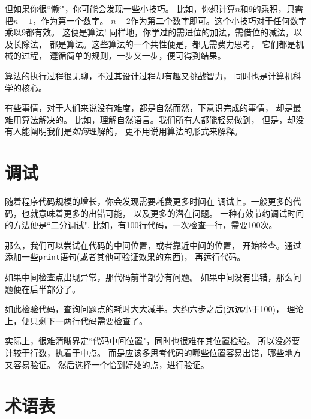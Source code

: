 \documentclass[10pt]{book}
\begin{document}
但如果你很``懒`"，你可能会发现一些小技巧。
比如，你想计算$n$和9的乘积，只需把$n-1$，作为第一个数字。
$n-2$作为第二个数字即可。这个小技巧对于任何数字乘以9都有效。
这便是算法!
同样地，你学过的需进位的加法，需借位的减法，以及长除法，
都是算法。这些算法的一个共性便是，都无需费力思考，
它们都是机械的过程，
遵循简单的规则，一步又一步，便可得到结果。

算法的执行过程很无聊，不过其设计过程却有趣又挑战智力，
同时也是计算机科学的核心。

有些事情，对于人们来说没有难度，都是自然而然，下意识完成的事情，
却是最难用算法解决的。
比如，理解自然语言。我们所有人都能轻易做到，
但是，却没有人能阐明我们是{\em 如何}理解的，
更不用说用算法的形式来解释。

\section{调试}
\label{bisectbug}
随着程序代码规模的增长，你会发现需要耗费更多时间在
调试上。一般更多的代码，也就意味着更多的出错可能，
以及更多的潜在问题。
一种有效节约调试时间的方法便是``二分调试".
比如，有100行代码，一次检查一行，需要100次。

那么，我们可以尝试在代码的中间位置，或者靠近中间的位置，
开始检查。通过添加一些{\tt print}语句(或者其他可验证效果的东西)，
再运行代码。

如果中间检查点出现异常，那代码前半部分有问题。
如果中间没有出错，那么问题便在后半部分了。

如此检验代码，查询问题点的耗时大大减半。大约六步之后(远远小于100)，
理论上，便只剩下一两行代码需要检查了。

实际上，很难清晰界定``代码中间位置"，同时也很难在其位置检验。
所以没必要计较于行数，执着于中点。
而是应该多思考代码的哪些位置容易出错，哪些地方又容易验证。
然后选择一个恰到好处的点，进行验证。



\section{术语表}
\end{document}
